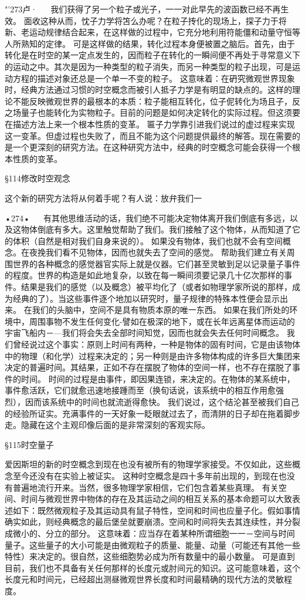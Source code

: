 "'273卢·
  
我们获得了另一个粒子或光子，一一对此早先的波函数已经不再生效。
面收这种从而，忱子力学将笘么办呢？在粒子抟化的现场上，探子力于将新、老运动规律结合起来，在这样做的过程中，它充分地利用符能僵和动量守恒等人所熟知的定律。
可是这样做的结果，转化过程本身便被置之脑后。首先，由于转化是在时空的某一定点发生的，因而粒子在转化的一瞬间便不再处于寻常意义下的运动之中。其次是因为一种类型的粒子消失，而另一种类型的粒子出现，可是运动方程的描述对象还总是一个单一不变的粒子。
这意味着：在砃究微观世界现象时，经典方法通过习惯的时空概念而被引人抵子力学是有明显的缺点的。这样的理论不能反映微观世界的最根本的本质：粒子能相互转化，位子伲转化为场且子，反之场量子也能转化为实物粒子。目前的问题是如何决定转化的实际过程。但这须要在描述方法上来一个根本性质的变革。
匾子力学靠引进我们说过的虚过程来实现这一变革。但虚过程也失败了，而且不能为这个问题提供最终的解答。现在需要的是一个更深刻的研究方法。在这种研究方法中，经典的时空概念可能会获得一个根本性质的变革。

§114修改时空观念

这个新的研究方法将从何着手呢？有人说：放弁我们一

•274•
 
有其他思维活动的话，我们绝不可能决定物体离开我们倒底有多远，以及这物体倒底有多大。这里触觉帮助了我们。我们接触了这个物体，从而知道了它的体积（自然是相对我们自身来说的）。
如果没有物体，我们也就不会有空间概念。在夜挽我们看不见物体，因而也就失去了空间的感觉。
帮助我们建立有关周围世界的各种概念的感觉器官实际上就是仪器。它们甚至灵敏到足以记录量子事件的程度。世界的构造是如此地复杂，以致在每一瞬间须要记录几十亿次那样的事件。结果是我们的感觉（以及概念）被平均化了（或者如物理学家所说的那样，成为经典的了）。当这些事件逐个地加以研究时，量子规律的特殊本性便会显示出来。
在我们的头脑中，空间不是具有物质本原的唯一东西。
如果在我们所处的环境中，周围事物不发生任何变化-譬如在极深的地下，或在长年远离星体而运动的宇宙飞船内－—我们将会失去全部时间知觉，因而也就会失去任何时间概念。
我们曾经说过这个事实：原则上时间有两种，一种是物体的固有时间，它是由该物体中的物理（和化学）过程来决定的；另一种则是由许多物体构成的许多巨大集团来决定的普遍时间。其结果，正如不存在摆脱了物体的空间一样，也不存在摆脱了事件的时间。
时间的过程是由事件，即因果连锁，来决定的。在物体的某系统中，事件愈活跃，它们就愈迅速地接踵而至（换旬话说，该系统中的相互作用愈强烈），因而该系统中的时间也就流逝得愈快。
我们说过，这个结沦甚至被我们自己的经验所证实。充满事件的一天好象一眨眼就过去了，而清阱的日子却在拖着脚步走。隐藏在这个主观印像后面的是非常深刻的客观实际。

§115时空量子

爱因斯坦的新的时空概念到现在也没有被所有的物理学家接受。不仅如此，这些概念至今还没有在实验上被证实。
这种时空概念是四十多年前出现的，到现在也没有普遍地流行开来。当然，很多物理学家相信，它们包含着某些真理。
有关空间、时间与微观世界中物体的存在及其运动之间的相互关系的基本命题可以大致表述如下：既然微观粒子及其运动具有鼠子特性，空间和时间也应量子化。假如事情确实如此，则经典概念的最后堡垒就要崩溃。空间和时间将失去其连续性，并分裂成微小的、分立的部分。
这意味着：应当存在着某种所谓细胞一一－空间与时间量子。这些量子的大小可能是由微观粒子的质量、能量、动量（可能还有其他一些特性）来决定的。很自然，这些细胞势必成为所有数量中的最小数量。
可是直到目前，我们也不具备有关任何那样的长度元或肘间元的知识。这可能意味着，这个长度元和时间元，已经超出测昼微观世界长度和时间最精确的现代方法的灵敏程度。

